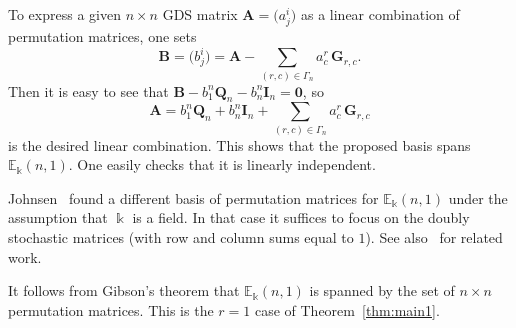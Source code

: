 \documentclass[ALCO,ThmDefs,Unicode,epreuves]{cedram}
\newcommand{\E}{\mathbb{E}}
\newcommand{\bA}{\mathbf{A}}
\newcommand{\bB}{\mathbf{B}}
\newcommand{\bQ}{\mathbf{Q}}
\newcommand{\bI}{\mathbf{I}}
\newcommand{\bG}{\mathbf{G}}
\newcommand{\bzero}{\mathbf{0}}
\begin{document}
To express a given $n \times n$ GDS matrix $\bA = \big(a^i_j \big)$ as
a linear combination of permutation matrices, one sets
\begin{equation}
\bB = \big(b^i_j \big) = \bA - \textstyle \sum_{(r,c) \in \Gamma_n}
a^r_c \, \bG_{r,c}.
\end{equation}
Then it is easy to see that $\bB - b^n_1 \bQ_n - b^n_n \bI_n = \bzero$, so
\begin{equation}
\bA = b^n_1 \bQ_n + b^n_n \bI_n + \textstyle \sum_{(r,c) \in \Gamma_n}
a^r_c \, \bG_{r,c}
\end{equation}
is the desired linear combination. This shows that the proposed basis
spans $\E_\Bbbk(n,1)$. One easily checks that it is linearly
independent.


Johnsen~\cite{Johnsen} found a different basis of permutation matrices
for $\E_\Bbbk(n,1)$ under the assumption that $\Bbbk$ is a field. In
that case it suffices to focus on the doubly stochastic matrices (with
row and column sums equal to $1$). See also~\cite{Lai} for related work.

\begin{rema}
 It follows from Gibson's theorem that $\E_\Bbbk(n,1)$ is spanned by
 the set of $n \times n$ permutation matrices. This is the $r=1$
 case of Theorem~\ref{thm:main1}. 
\end{rema}






\end{document}
